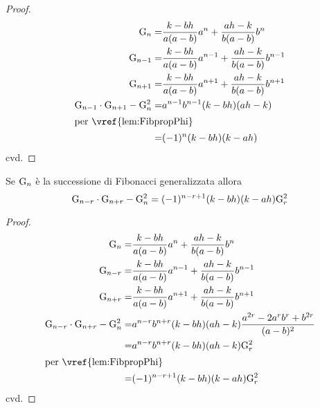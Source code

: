 \begin{proof}
\begin{align*}
\Gib{n}=&{}\dfrac{k-bh}{a(a-b)}a^n+\dfrac{ah-k}{b(a-b)}b^n\\
\Gib{n-1}=&{}\dfrac{k-bh}{a(a-b)}a^{n-1}+\dfrac{ah-k}{b(a-b)}b^{n-1}\\
\Gib{n+1}=&{}\dfrac{k-bh}{a(a-b)}a^{n+1}+\dfrac{ah-k}{b(a-b)}b^{n+1}\\
\Gib{n-1}\cdot\Gib{n+1}-\Gib{n}^2=&a^{n-1}b^{n-1}(k-bh)(ah-k)\\
	\intertext{per~\vref{lem:FibpropPhi}}
	=&(-1)^{n}(k-bh)(k-ah)\\
\end{align*}
cvd.
\end{proof}
\begin{thm}\label{thm:fibCatalanGen}
	Se $\mathrm{G}_{n}$ è la successione di Fibonacci generalizzata allora 
	\begin{equation}
		\mathrm{G}_{n-r}\cdot\mathrm{G}_{n+r}-\mathrm{G}_{n}^2=(-1)^{n-r+1}(k-bh)(k-ah)\mathrm{G}_{r}^2
	\end{equation}\label{eqn:fibCatalanGen}
\end{thm}
\begin{proof}
	\begin{align*}
		\Gib{n}=&{}\dfrac{k-bh}{a(a-b)}a^n+\dfrac{ah-k}{b(a-b)}b^n\\
		\Gib{n-r}=&{}\dfrac{k-bh}{a(a-b)}a^{n-1}+\dfrac{ah-k}{b(a-b)}b^{n-1}\\
		\Gib{n+r}=&{}\dfrac{k-bh}{a(a-b)}a^{n+1}+\dfrac{ah-k}{b(a-b)}b^{n+1}\\
		\Gib{n-r}\cdot\Gib{n+r}-\Gib{n}^2=&a^{n-r}b^{n+r}(k-bh)(ah-k)\dfrac{a^{2r}-2a^rb^r+b^{2r}}{(a-b)^2}\\
		=&a^{n-r}b^{n+r}(k-bh)(ah-k)\Gib{r}^2\\
		\intertext{per~\vref{lem:FibpropPhi}}
		=&(-1)^{n-r+1}(k-bh)(k-ah)\Gib{r}^2\\
	\end{align*}
	cvd.
\end{proof}
